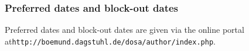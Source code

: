\documentclass[a4paper,10pt]{article}
\begin{document}
\subsubsection*{Preferred dates and block-out dates}

Preferred dates and block-out dates are given via the online portal at\newline \texttt{http://boemund.dagstuhl.de/dosa/author/index.php}.

% 
% 
\end{document}
